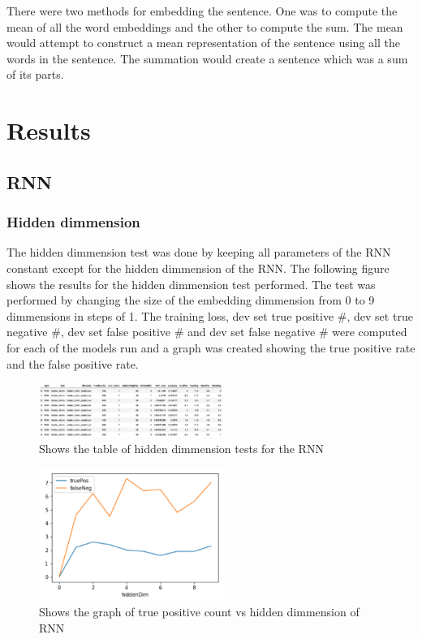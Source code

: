\documentclass[twoside,twocolumn]{article}
\begin{document}
There were two methods for embedding the sentence. One was to compute the mean of all the
word embeddings and the other to compute the sum. The mean would attempt to construct a mean
representation of the sentence using all the words in the sentence. The summation would create
a sentence which was a sum of its parts.


\section{Results}

\subsection{RNN}

\subsubsection{Hidden dimmension}

The hidden dimmension test was done by keeping all parameters of the RNN constant except for the 
hidden dimmension of the RNN. The following figure shows the results for the hidden dimmension
test performed. The test was performed by changing the size of the embedding dimmension from 0 to 9
dimmensions in steps of 1. The training loss, dev set true positive #, dev set true negative #,
dev set false positive # and dev set false negative # were computed for each of the models run 
and a graph was created showing the true positive rate and the false positive rate.

\begin{figure}[H]
\includegraphics[width=6cm]{hidden_dimm_test_table}
\centering
\caption{Shows the table of hidden dimmension tests for the RNN}
\end{figure}

\begin{figure}[H]
\includegraphics[width=6cm]{hidden_dimm_test_graph}
\centering
\caption{Shows the graph of true positive count vs hidden dimmension of RNN}
\end{figure}
\end{document}
